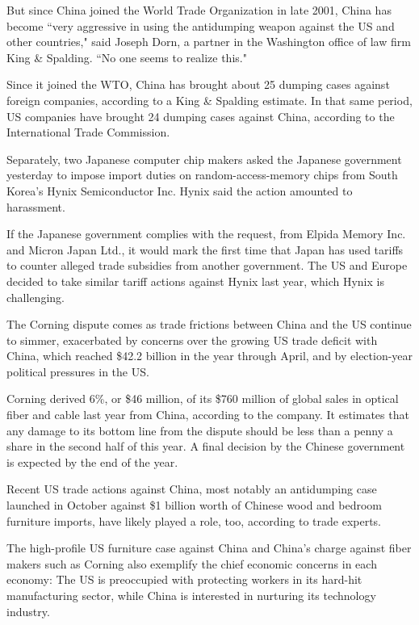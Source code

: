 \documentclass[letterpaper,12pt]{article}
\begin{document}
But since China joined the World Trade Organization in late 2001, China has become ``very aggressive in using the antidumping weapon against the US and other countries," said Joseph Dorn, a partner in the Washington office of law firm King \& Spalding. ``No one seems to realize this."

Since it joined the WTO, China has brought about 25 dumping cases against foreign companies, according to a King \& Spalding estimate. In that same period, US companies have brought 24 dumping cases against China, according to the International Trade Commission.

Separately, two Japanese computer chip makers asked the Japanese government yesterday to impose import duties on random-access-memory chips from South Korea's Hynix Semiconductor Inc. Hynix said the action amounted to harassment.

If the Japanese government complies with the request, from Elpida Memory Inc. and Micron Japan Ltd., it would mark the first time that Japan has used tariffs to counter alleged trade subsidies from another government. The US and Europe decided to take similar tariff actions against Hynix last year, which Hynix is challenging.

The Corning dispute comes as trade frictions between China and the US continue to simmer, exacerbated by concerns over the growing US trade deficit with China, which reached \$42.2 billion in the year through April, and by election-year political pressures in the US.

Corning derived 6\%, or \$46 million, of its \$760 million of global sales in optical fiber and cable last year from China, according to the company. It estimates that any damage to its bottom line from the dispute should be less than a penny a share in the second half of this year. A final decision by the Chinese government is expected by the end of the year.

Recent US trade actions against China, most notably an antidumping case launched in October against \$1 billion worth of Chinese wood and bedroom furniture imports, have likely played a role, too, according to trade experts.

The high-profile US furniture case against China and China's charge against fiber makers such as Corning also exemplify the chief economic concerns in each economy: The US is preoccupied with protecting workers in its hard-hit manufacturing sector, while China is interested in nurturing its technology industry.
\end{document}
